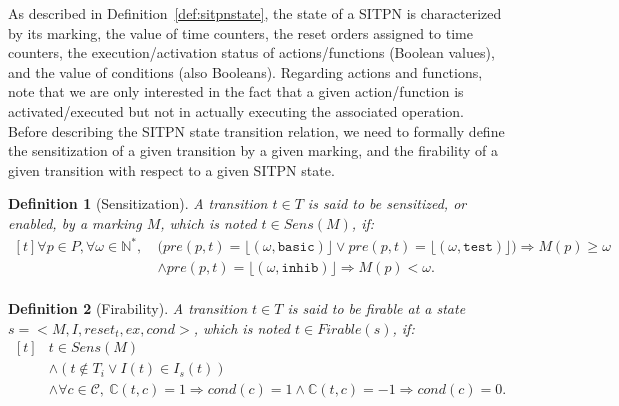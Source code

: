 \documentclass[pdflatex,sn-mathphys]{sn-jnl}%
\theoremstyle{thmstyleone}%
\theoremstyle{thmstyletwo}%
\theoremstyle{thmstylethree}%
\newtheorem{definition}{Definition}%
\begin{document}
As described in Definition~\ref{def:sitpnstate}, the state of a SITPN
is characterized by its marking, the value of time counters, the reset
orders assigned to time counters, the execution/activation status of
actions/functions (Boolean values), and the value of conditions (also
Booleans). Regarding actions and functions, note that we are only
interested in the fact that a given action/function is
activated/executed but not in actually executing the associated
operation.\\

Before describing the SITPN state transition relation, we need to
formally define the sensitization of a given transition by a given
marking, and the firability of a given transition with respect to a
given SITPN state.

\begin{definition}[Sensitization]
  \label{def:sens}
  A transition $t\in{}T$ is said to be sensitized, or enabled, by a
  marking $M$, which is noted $t\in{}Sens(M)$, if:
  \begin{equation*}
    \begin{aligned}[t]
      \forall{}p\in{}P,\forall\omega\in\mathbb{N}^{*},~&\big(pre(p,t)=\lfloor(\omega,\mathtt{basic})\rfloor\lor{}pre(p,t)=\lfloor(\omega,\mathtt{test})\rfloor\big)\Rightarrow{}M(p)\ge{}\omega\\
                                                       & \land{}pre(p,t)=\lfloor(\omega,\mathtt{inhib})\rfloor\Rightarrow{}M(p)<{}\omega.\\
    \end{aligned}
\end{equation*}
\end{definition}

\begin{definition}[Firability]
  \label{def:firable}
  A transition $t\in{}T$ is said to be firable at a state
  ${s={<}M,I,reset_t,ex,cond{>}}$, which is noted $t\in{}Firable(s)$,
  if:
  \begin{equation*}
    \begin{aligned}[t]
      & t\in{}Sens(M) \\
      & \land{}(t\notin{}T_i\lor{}I(t)\in{}I_s(t)) \\
      & \land\forall{}c\in\mathcal{C},~\mathbb{C}(t, c)=1\Rightarrow{}cond(c)=1\land\mathbb{C}(t, c)=-1\Rightarrow{}cond(c)=0. \\
    \end{aligned}
  \end{equation*}
\end{definition}
\end{document}
